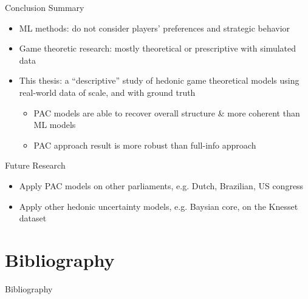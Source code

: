 \documentclass[xcolor=dvipsnames]{beamer}
\begin{document}
\begin{frame}{Conclusion}
  Summary
  \begin{itemize}
    \item ML methods: do not consider players' preferences and strategic behavior
    \item Game theoretic research: mostly theoretical or prescriptive with simulated data
    \item This thesis: a ``descriptive'' study of hedonic game theoretical models using real-world data of scale, and with ground truth
    \begin{itemize}
      \item PAC models are able to recover overall structure \& more coherent than ML models
      \item PAC approach result is more robust than full-info approach
    \end{itemize}
  \end{itemize}

  Future Research
  \begin{itemize}
  \item Apply PAC models on other parliaments, e.g. Dutch, Brazilian, US congress
  \item Apply other hedonic uncertainty models, e.g. Baysian core, on the Knesset dataset
  \end{itemize}
\end{frame}


\section*{Bibliography}
\begin{frame}[allowframebreaks]{Bibliography}
  \printbibliography
\end{frame}
\end{document}
